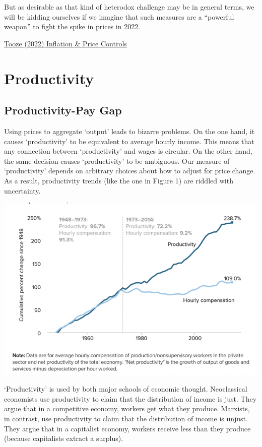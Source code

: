 \documentclass[
]{book}
\begin{document}
But as desirable as that kind of heterodox challenge may be in general terms, we will be kidding ourselves if we imagine that such measures are a ``powerful weapon'' to fight the spike in prices in 2022.

\href{https://adamtooze.substack.com/p/top-links-65-inflation-and-price}{Tooze (2022) Inflation \& Price Controls}

\hypertarget{productivity}{%
\chapter{Productivity}\label{productivity}}

\hypertarget{productivity-pay-gap}{%
\section{Productivity-Pay Gap}\label{productivity-pay-gap}}

Using prices to aggregate `output' leads to bizarre problems. On the one hand, it causes `productivity' to be equivalent to average hourly income. This means that any connection between `productivity' and wages is circular. On the other hand, the same decision causes `productivity' to be ambiguous. Our measure of `productivity' depends on arbitrary choices about how to adjust for price change. As a result, productivity trends (like the one in Figure 1) are riddled with uncertainty.

\includegraphics{fig/productivity_pay_gap.png}

`Productivity' is used by both major schools of economic thought. Neoclassical economists use productivity to claim that the distribution of income is just. They argue that in a competitive economy, workers get what they produce. Marxists, in contrast, use productivity to claim that the distribution of income is unjust. They argue that in a capitalist economy, workers receive less than they produce (because capitalists extract a surplus).
\end{document}
